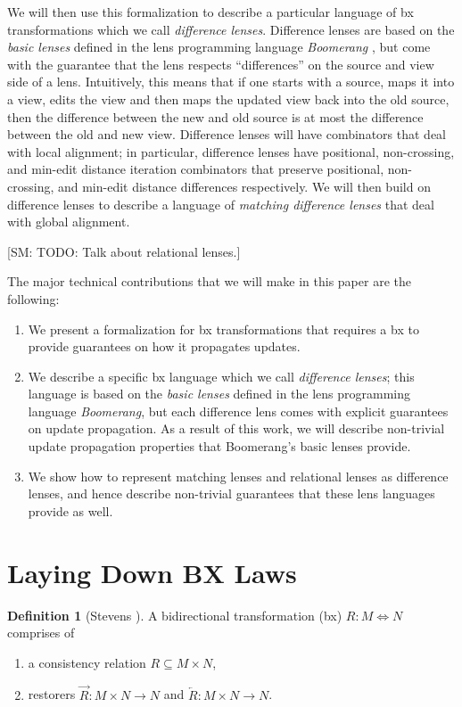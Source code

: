 \documentclass[acmsmall,review,anonymous]{acmart}\settopmatter{printfolios=true,printccs=false,printacmref=false}
\theoremstyle{definition}
\newtheorem{definition}{Definition}
\newcommand{\FINISH}[3]{\ifdraft\textcolor{#1}{[#2: #3]}\fi}
\newcommand{\sam}[1]{\FINISH{dkpurple}{SM}{#1}}
\begin{document}
We will then use this formalization to describe a particular language of bx transformations which we call {\em difference lenses}. Difference lenses are based on the {\em basic lenses} defined in the lens programming language {\em Boomerang} \cite{foster2009bidirectional}, but come with the guarantee that the lens respects ``differences'' on the source and view side of a lens. Intuitively, this means that if one starts with a source, maps it into a view, edits the view and then maps the updated view back into the old source, then the difference between the new and old source is at most the difference between the old and new view. Difference lenses will have combinators that deal with local alignment; in particular, difference lenses have positional, non-crossing, and min-edit distance iteration combinators that preserve positional, non-crossing, and min-edit distance differences respectively. We will then build on difference lenses to describe a language of {\em matching difference lenses} that deal with global alignment. 

\sam{TODO: Talk about relational lenses.}

The major technical contributions that we will make in this paper are the following:
\begin{enumerate}
\item
We present a formalization for bx transformations that requires a bx to provide guarantees on how it propagates updates. 
\item
We describe a specific bx language which we call {\em difference lenses}; this language is based on the {\em basic lenses} defined in the lens programming language {\em Boomerang}\cite{foster2009bidirectional}, but each difference lens comes with explicit guarantees on update propagation. As a result of this work, we will describe non-trivial update propagation properties that Boomerang's basic lenses provide.
  \item
  We show how to represent matching lenses and  relational lenses \cite{bohannon2006relational} as difference lenses, and hence describe non-trivial guarantees that these lens languages provide as well.
\end{enumerate}
\section{Laying Down BX Laws}
\begin{definition}[Stevens \cite{stevens2010bidirectional}]
A bidirectional transformation (bx) $R : M \Leftrightarrow N$ comprises of 
\begin{enumerate}
\item
a consistency relation $R \subseteq M \times N$,
\item
restorers $\overrightarrow{R} : M \times N \rightarrow N$ and $\overleftarrow{R} : M \times N \longrightarrow
N$.
\end{enumerate}
\end{definition}
\end{document}
